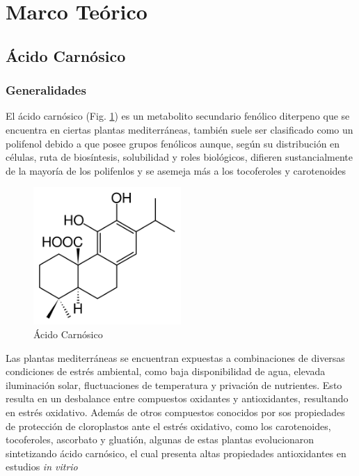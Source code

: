 \documentclass[11pt,a4paper]{article}
\begin{document}

\section{Marco Teórico}


\subsection{Ácido Carnósico}

\subsubsection{Generalidades}


El ácido carnósico (Fig. \ref{carnosic_acid}) es un metabolito secundario fenólico diterpeno que se encuentra en ciertas plantas mediterráneas, también suele ser clasificado como un polifenol debido a que posee grupos fenólicos aunque, según su distribución en células, ruta de biosíntesis, solubilidad y roles biológicos, difieren sustancialmente de la mayoría de los polifenlos y se asemeja más a los tocoferoles y carotenoides \cite{carnosic_review} 

\begin{figure}[h]
	\centering
	\includegraphics[width=0.5\textwidth]{carnosic_acid}
	\caption{Ácido Carnósico\label{carnosic_acid}}
\end{figure}

Las plantas mediterráneas se encuentran expuestas a combinaciones de diversas condiciones de estrés ambiental, como baja disponibilidad de agua, elevada iluminación solar, fluctuaciones de temperatura y privación de nutrientes. Esto resulta en un desbalance entre compuestos oxidantes y antioxidantes, resultando en estrés oxidativo. Además de otros compuestos conocidos por sos propiedades de protección de cloroplastos ante el estrés oxidativo, como los carotenoides, tocoferoles, ascorbato y gluatión, algunas de estas plantas evolucionaron sintetizando ácido carnósico, el cual presenta altas propiedades antioxidantes en estudios \emph{in vitrio} \cite{carnosic_review}
\end{document}
